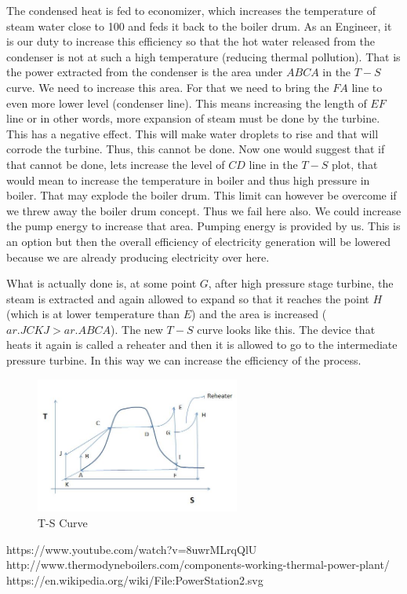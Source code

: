 \documentclass{report}
\begin{document}
\par The condensed heat is fed to economizer, which increases the temperature of steam water close to 100 and feds it back to the boiler drum. As an Engineer, it is our duty to increase this efficiency so that the hot water released from the condenser is not at such a high temperature (reducing thermal pollution). That is the power extracted from the condenser is the area under $ABCA$ in the $T-S$ curve. We need to increase this area. For that we need to bring the $FA$ line to even more lower level (condenser line). This means increasing the length of $EF$ line or in other words,  more expansion of steam must be done by the turbine. This has a negative effect. This will make water droplets to rise and that will corrode the turbine. Thus, this cannot be done. Now one would suggest that if that cannot be done, lets increase the level of $CD$ line in the $T-S$ plot, that would mean to increase the temperature in boiler and thus high pressure in boiler. That may explode the boiler drum.  This limit can however be overcome if we threw away the boiler drum concept. Thus we fail here also. We could increase the pump energy to increase that area. Pumping energy is provided by us. This is an option but then the overall efficiency of electricity generation will be lowered because we are already producing electricity over here.

\par What is actually done is, at some point $G$, after high pressure stage turbine, the steam is extracted and again allowed to expand so that it reaches the point $H$ (which is at lower temperature than $E$) and the area is increased ($ar. JCKJ > ar. ABCA$). The new $T-S$ curve looks like this. The device that heats it again is called a reheater and then it is allowed to go to the intermediate pressure turbine. In this way we can increase the efficiency of the process.
\\ 
\begin{figure}[H]
\centering \includegraphics[width=0.6\textwidth]{captures/Capture3.JPG}
\caption{T-S Curve}
\end{figure}

\begin{thebibliography}{999}
https://www.youtube.com/watch?v=8uwrMLrqQlU
http://www.thermodyneboilers.com/components-working-thermal-power-plant/
https://en.wikipedia.org/wiki/File:PowerStation2.svg
\end{thebibliography}
\end{document}
